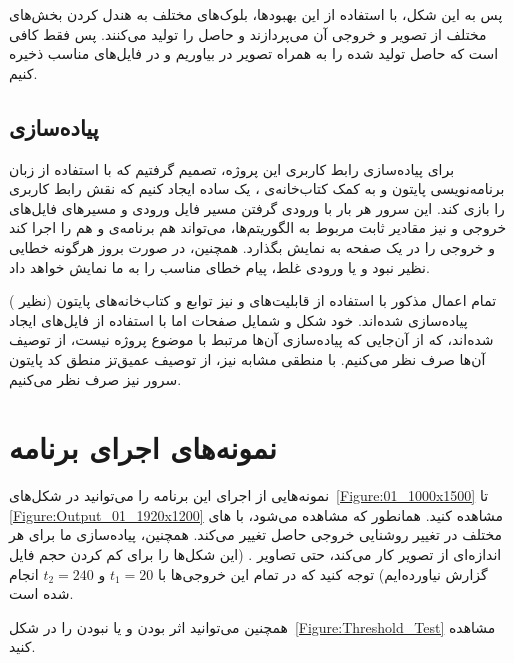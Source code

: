 \documentclass[12pt,onecolumn,a4paper]{article}
\begin{document}
پس به این شکل، با استفاده از این بهبودها، بلوک‌های مختلف به هندل کردن بخش‌های مختلف از تصویر و خروجی آن می‌پردازند و حاصل را تولید می‌کنند. پس فقط کافی است که حاصل تولید شده را به همراه تصویر  در  بیاوریم و در فایل‌های مناسب ذخیره کنیم.

\subsection{پیاده‌سازی }
برای پیاده‌سازی رابط کاربری این پروژه، تصمیم گرفتیم که با استفاده از زبان برنامه‌نویسی پایتون و به کمک کتاب‌خانه‌ی ، یک  ساده ایجاد کنیم که نقش رابط کاربری را بازی کند. این سرور هر بار با ورودی گرفتن مسیر فایل ورودی و مسیر‌های فایل‌های خروجی و نیز مقادیر ثابت مربوط به الگوریتم‌ها، می‌تواند هم برنامه‌ی  و هم  را اجرا کند و خروجی را در یک صفحه به نمایش بگذارد. همچنین، در صورت بروز هرگونه خطایی نظیر نبود  و یا ورودی غلط، پیام خطای مناسب را به ما نمایش خواهد داد.

تمام اعمال مذکور با استفاده از قابلیت‌های  و نیز توابع و کتاب‌خانه‌های پایتون (نظیر ) پیاده‌سازی شده‌اند. خود شکل و شمایل صفحات اما با استفاده از فایل‌های  ایجاد شده‌اند، که از آن‌جایی که پیاده‌سازی آن‌ها مرتبط با موضوع پروژه نیست، از توصیف آن‌ها صرف نظر می‌کنیم. با منطقی مشابه نیز، از توصیف عمیق‌تز منطق کد پایتون سرور نیز صرف نظر می‌کنیم.

\section{نمونه‌های اجرای برنامه}
نمونه‌هایی از اجرای این برنامه را می‌توانید در شکل‌های~\ref{Figure:01_1000x1500} تا \ref{Figure:Output_01_1920x1200} مشاهده کنید. همانطور که مشاهده می‌شود، با های مختلف در تغییر روشنایی خروجی حاصل تغییر می‌کند. همچنین، پیاده‌سازی ما برای هر اندازه‌ای از تصویر کار می‌کند، حتی تصاویر . (این شکل‌ها را برای کم کردن حجم فایل گزارش نیاورده‌ایم) توجه کنید که در تمام این خروجی‌ها  با $t_1=20$ و $t_2=240$ انجام شده است.

همچنین می‌توانید اثر بودن و یا نبودن  را در شکل~\ref{Figure:Threshold_Test} مشاهده کنید.
\end{document}
